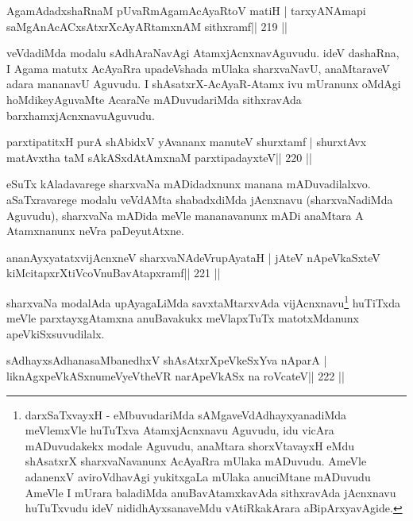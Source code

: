 \begin{shl}
AgamAdadxshaRnaM pUvaRmAgamAcAyaRtoV matiH |
tarxyANAmapi saMgAnAcACxsAtxrXcAyARtamxnAM sithxramf\hfill || 219 ||
\end{shl}

\begin{artha}
veVdadiMda modalu sAdhAraNavAgi AtamxjAcnxnavAguvudu. ideV dashaRna, I Agama matutx AcAyaRra upadeVshada mUlaka sharxvaNavU, anaMtaraveV adara mananavU Aguvudu. I shAsatxrX-AcAyaR-Atamx ivu mUranunx oMdAgi hoMdikeyAguvaMte AcaraNe mADuvudariMda sithxravAda barxhamxjAcnxnavu\break Aguvudu.
\end{artha}

\begin{shl}
parxtipatitxH purA shAbidxV yAvananx manuteV shurxtamf |
shurxtAvx matAvx\s tha taM sAkASxdAtAmxnaM parxtipadayxteV\hfill || 220 ||
\end{shl}

\begin{artha}
eSuTx kAladavarege sharxvaNa mADidadxnunx manana mADuvadilalxvo. aSaTxravarege modalu veVdAMta shabadxdiMda jAcnxnavu (sharxvaNadiMda Aguvudu), sharxvaNa mADida meVle mananavanunx mADi anaMtara A Atamxnanunx neVra paDeyutAtxne.
\end{artha}

\begin{shl}
ananAyxyatatxvijAcnxneV sharxvaNAdeVrupAyataH |
jAteV nApeVkaSxteV kiMcitapxrXtiVcoV\s nuBavAtapxramf\hfill || 221 ||
\end{shl}

\begin{artha}
sharxvaNa modalAda upAyagaLiMda savxtaMtarxvAda vijAcnxnavu\footnote{darxSaTxvayxH - eMbuvudariMda sAMgaveVdAdhayxyanadiMda meVlemxVle huTuTxva AtamxjAcnxnavu Aguvudu, idu vicAra mADuvudakekx modale Aguvudu, anaMtara shorxVtavayxH eMdu shAsatxrX sharxvaNavanunx AcAyaRra mUlaka mADuvudu. AmeVle adanenxV aviroVdhavAgi yukitxgaLa mUlaka anuciMtane mADuvudu AmeVle I mUrara baladiMda anuBavAtamxkavAda sithxravAda jAcnxnavu huTuTxvudu ideV nididhAyxsanaveMdu vAtiRkakArara aBipArxyavAgide.} huTiTxda meVle parxtayxgAtamxna anuBavakukx meVlapxTuTx matotxMdanunx apeVkiSxsuvudilalx.
\end{artha}

\begin{shl}
sAdhayxsAdhanasaMbanedhxV shAsAtxrXpeVkeSxYva nAparA |
liknAgxpeVkASx\s numeVyeV\s theVR narApeVkASx na roVcateV\hfill || 222 ||
\end{shl}

